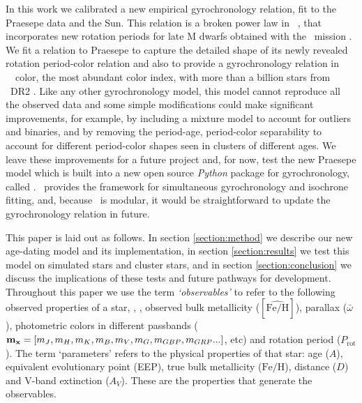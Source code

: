 In this work we calibrated a new empirical gyrochronology relation, fit to the
Praesepe data and the Sun.
This relation is a broken power law in \gaia\ \gcolor, that incorporates new
rotation periods for late M dwarfs obtained with the \ktwo\ mission
\citep{douglas2017, rebull2017}.
We fit a relation to Praesepe to capture the detailed shape of its newly
revealed rotation period-color relation and also to provide a gyrochronology
relation in \gaia\ \gcolor\ color, the most abundant color index, with more
than a billion stars from \gaia\ DR2 \citep{brown2018}.
Like any other gyrochronology model, this model cannot reproduce all the
observed data and some simple modifications could make significant
improvements, for example, by including a mixture model to account for
outliers and binaries, and by removing the period-age, period-color
separability to account for different period-color shapes seen in clusters of
different ages.
We leave these improvements for a future project and, for now, test the
new Praesepe model which is built into a new open source {\it Python} package
for gyrochronology, called \sd.
\sd\ provides the framework for simultaneous gyrochronology and isochrone
fitting, and, because \sd\ is modular, it would be straightforward to update
the gyrochronology relation in future.

This paper is laid out as follows.
In section \ref{section:method} we describe our new age-dating model and its
implementation, in section \ref{section:results} we test this model on
simulated stars and cluster stars, and in section \ref{section:conclusion} we
discuss the implications of these tests and future pathways for development.
Throughout this paper we use the term {\it `observables'} to refer to the
following observed properties of a star, \teff, \logg, observed bulk
metallicity ($[\hat{\mathrm{Fe/H}}]$), parallax ($\bar{\omega}$), photometric
colors in different passbands (${\bf m_x} = [m_J, m_H, m_K, m_B, m_V, m_G,
m_{GBP}, m_{GRP}...]$, etc) and rotation period ($P_{\mathrm{rot}}$).
The term `parameters' refers to the physical properties of that star: age
($A$), equivalent evolutionary point (EEP), true bulk metallicity
($\mathrm{Fe/H}$), distance ($D$) and V-band extinction ($A_V$).
These are the properties that generate the observables.
